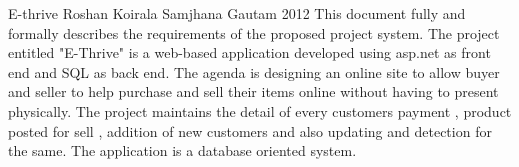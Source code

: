  \begin{conf-abstract}[]
{E-thrive}
{
Roshan Koirala
Samjhana Gautam
}
{2012}
This document fully and formally describes the requirements of the proposed
project system. The project entitled "E-Thrive" is a web-based application
developed using asp.net as front end and SQL as back end. The agenda is
designing an online site to allow buyer and seller to help purchase and sell
their items online without having to present physically. The project maintains
the detail of every customers payment , product posted for sell , addition of new
customers and also updating and detection for the same. The application is a
database oriented system.
  \end{conf-abstract}